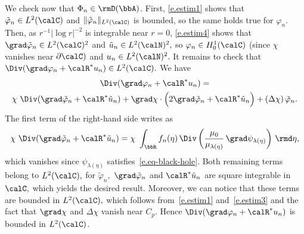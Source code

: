 \begin{proofc}
\begin{step}\label{listproofprop3.7.2}
We check now that $\Phi_n \in \rmD(\bbA)$. First, \eqref{e.estim1} shows that $\tilde\varphi_n \in L^2(\calC)$ and $\| \tilde\varphi_n \|_{L^2(\calC)}$ is bounded, so the same holds true for $\varphi_n.$ Then, as $r^{-1}|\log r|^{-2}$ is integrable near $r=0$, \eqref{e.estim4} shows that $\grad\tilde\varphi_n \in L^2(\calC)^2$ and $\tilde u_n \in L^2(\calN)^2,$ so $\varphi_n \in H^1_0(\calC)$ (since $\chi$ vanishes near $\partial\calC)$ and $u_n \in L^2(\calN)^2.$ It remains to check that $\Div(\grad \varphi_n + \calR^* u_n) \in L^2(\calC).$ We have
\begin{multline*}
\Div(\grad \varphi_n + \calR^* u_n)=\\
\chi\ \Div(\grad \tilde\varphi_n + \calR^* \tilde u_n) + \grad\chi \cdot \Big(2\grad \tilde\varphi_n + \calR^* \tilde u_n\Big) + (\Delta \chi) \,\tilde\varphi_n.
\end{multline*}
The first term of the right-hand side writes as
\[
\chi\ \Div(\grad \tilde\varphi_n + \calR^* \tilde u_n) = \chi\ \int_\bbR f_n(\eta)\, \Div \left(\frac{\mu_0}{\mu_{\lambda(\eta)}}\,\grad \psi_{\lambda(\eta)} \right) \,\rmd\eta,
\]
which vanishes since $\psi_{\lambda(\eta)}$ satisfies~\eqref{e.eq-black-hole}. Both remaining terms belong to $L^2(\calC),$ for $\tilde\varphi_n,$ $\grad\tilde\varphi_n$ and $\calR^*\tilde u_n$ are square integrable in $\calC,$ which yields the desired result. Moreover, we can notice that these terms are bounded in $L^2(\calC),$ which follows from~\eqref{e.estim1} and~\eqref{e.estim3} and the fact that $\grad\chi$ and $\Delta \chi$ vanish near $C_p.$ Hence $\Div(\grad \varphi_n + \calR^* u_n)$ is bounded in $L^2(\calC)$.
\end{step}


\end{proofc}
